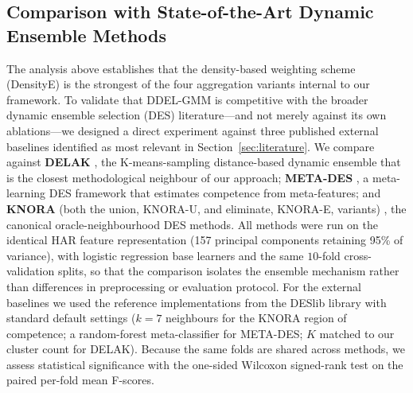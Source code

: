 \documentclass[lettersize,journal]{IEEEtran}
\newcommand{\tfourhighlight}[1]{{\color{tier4blue}#1}}
\begin{document}
	\subsection{\tfourhighlight{Comparison with State-of-the-Art Dynamic Ensemble Methods}}
	
	\tfourhighlight{\noindent The analysis above establishes that the density-based weighting scheme (DensityE) is the strongest of the four aggregation variants internal to our framework. To validate that DDEL-GMM is competitive with the broader dynamic ensemble selection (DES) literature—and not merely against its own ablations—we designed a direct experiment against three published external baselines identified as most relevant in Section~\ref{sec:literature}. We compare against \textbf{DELAK} \cite{guo_dynamic_2021}, the K-means-sampling distance-based dynamic ensemble that is the closest methodological neighbour of our approach; \textbf{META-DES} \cite{cruz_meta-oracle_2017}, a meta-learning DES framework that estimates competence from meta-features; and \textbf{KNORA} (both the union, KNORA-U, and eliminate, KNORA-E, variants) \cite{ko_dynamic_2008}, the canonical oracle-neighbourhood DES methods. All methods were run on the identical HAR feature representation (157 principal components retaining 95\% of variance), with logistic regression base learners and the same $10$-fold cross-validation splits, so that the comparison isolates the ensemble mechanism rather than differences in preprocessing or evaluation protocol. For the external baselines we used the reference implementations from the DESlib library with standard default settings ($k=7$ neighbours for the KNORA region of competence; a random-forest meta-classifier for META-DES; $K$ matched to our cluster count for DELAK). Because the same folds are shared across methods, we assess statistical significance with the one-sided Wilcoxon signed-rank test on the paired per-fold mean F-scores.}
	
\end{document}
